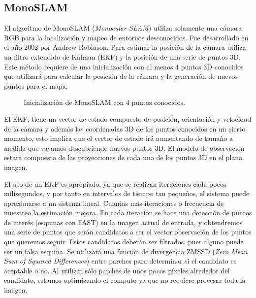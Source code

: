 \subsection{MonoSLAM}
El algoritmo de  MonoSLAM (\textit{Monocular SLAM}) \cite{Davison2007monoslam} utiliza solamente una cámara RGB para la localización y mapeo de entornos desconocidos. Fue desarrollado en el año 2002  por Andrew Robinson. Para estimar la posición de la cámara utiliza un filtro extendido de Kalman (EKF) y la posición de una serie de puntos 3D. Este método requiere de una inicialización con al menos 4 puntos 3D conocidos que utilizará para calcular la posición de la cámara y la generación de nuevos puntos para el mapa.
\begin{figure}[H]
\begin{center}
\end{center}
\caption{Inicialización de MonoSLAM con 4 puntos conocidos.}
\end{figure}

El EKF, tiene un vector de estado compuesto de posición, orientación y velocidad de la cámara y además las coordenadas 3D de los puntos conocidos en un cierto momento, esto implica que el vector de estado irá aumentando de tamaño a medida que vayamos descubriendo nuevos puntos 3D. El modelo de observación estará compuesto de las proyecciones de cada uno de los puntos 3D en el plano imagen.

El uso de un EKF es apropiado, ya que se realizan iteraciones cada pocos milisegundos, y por tanto en intervalos de tiempo tan pequeños, el sistema puede aproximarse a un sistema lineal. Cuantas más iteraciones o frecuencia de muestreo la estimación mejora. En cada iteración se hace una detección de puntos de interés (esquinas con FAST) en la imagen actual de entrada, y obtendremos una serie de puntos que serán candidatos a ser el vector observación de los puntos que queremos seguir. Estos candidatos deberán ser filtrados, pues alguno puede ser un falsa esquina. Se utilizará una función de divergencia ZMSSD (\textit{Zero Mean Sum of Squared Differences}) entre parches para determinar si el candidato es aceptable o no. Al utilizar sólo parches de unos pocos píxeles alrededor del candidato, estamos optimizando el computo ya que no requiere procesar toda la imagen.


